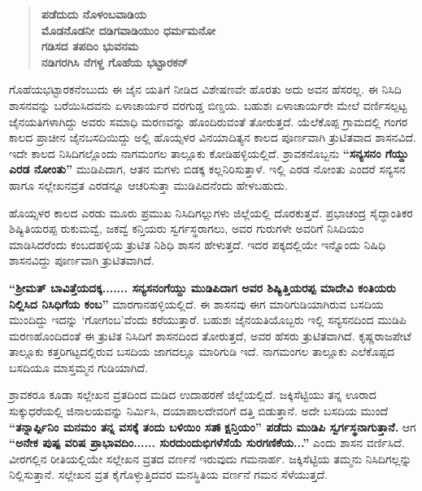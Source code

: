 \begin{verse}
\textbf{ಪಡೆದುದು ನೊಳಂಬವಾಡಿಯ} \\\textbf{ಮೊಡನೊಡನೀ ದಡಿಗವಾಡಿಯುಂ ಧರ್ಮಮನೋ} \\\textbf{ಗಡಿಸದ ತಪದಿಂ ಭುವನಮ} \\\textbf{ನಡಿಗರಗಿಸಿ ನೆಗಳ್ದ ಗೊಹೆಯ ಭಟ್ಟಾರಕನ್​}
\end{verse}

ಗೊಹೆಯಭಟ್ಟಾರಕನೆಂಬುದು ಈ ಜೈನ ಯತಿಗೆ ನೀಡಿದ ವಿಶೇಷಣವೇ ಹೊರತು ಅದು ಅವನ ಹೆಸರಲ್ಲ. ಈ ನಿಸಿದಿ ಶಾಸನವನ್ನು ಬರೆಯಿಸಿದವನು ಏಳಾಚಾರ್ಯರ ವರಗುಡ್ಡ ಬಿಣ್ಡಯ. ಬಹುಶಃ ಏಳಾಚಾರ್ಯರೇ ಮೇಲೆ ವರ್ಣಿಸಲ್ಪಟ್ಟ ಜೈನಯತಿಗಳಾಗಿದ್ದು ಅವರು ಸಮಾಧಿ ಮರಣವನ್ನು ಹೊಂದಿರುವಂತೆ ತೋರುತ್ತದೆ. ಯೆಲೆಕೊಪ್ಪ ಗ್ರಾಮದಲ್ಲಿ ಗಂಗರ ಕಾಲದ ಪ್ರಾಚೀನ ಜೈನಬಸದಿಯಿದ್ದು ಅಲ್ಲಿ ಹೊಯ್ಸಳರ ವಿನಯಾದಿತ್ಯನ ಕಾಲದ ಪೂರ್ಣವಾಗಿ ತ್ರುಟಿತವಾದ ಶಾಸನವಿದೆ. ಇದೇ ಕಾಲದ ನಿಸಿದಿಗಲ್ಲೊಂದು ನಾಗಮಂಗಲ ತಾಲ್ಲೂಕು ಕೋಡಿಹಳ್ಳಿಯಲ್ಲಿದೆ. ಶ್ರಾವಕನೊಬ್ಬನು \textbf{“ಸನ್ಯಸನಂ ಗೆಯ್ದು ಎರಡ ನೋಂತು”} ಮುಡಿಪಿದಾಗ, ಆತನ ಮಗಳು ಬಿಡಕ್ಕ ಕಲ್ಲನಿರಿಸುತ್ತಾಳೆ. ಇಲ್ಲಿ ಎರಡ ನೋಂತು ಎಂದರೆ ಸನ್ಯಸನ ಹಾಗೂ ಸಲ್ಲೇಖನವ್ರತ ಎರಡನ್ನೂ ಆಚರಿಸುತ್ತಾ ಮುಡಿಪಿದನೆಂದು ಹೇಳಬಹುದು.

ಹೊಯ್ಸಳರ ಕಾಲದ ಎರಡು ಮೂರು ಪ್ರಮುಖ ನಿಸಿದಿಗಲ್ಲುಗಳು ಜಿಲ್ಲೆಯಲ್ಲಿ ದೊರಕುತ್ತವೆ. ಪ್ರಭಾಚಂದ್ರ ಸೈದ್ಧಾಂತಿಕರ ಶಿಷ್ಯಿತಿಯರಪ್ಪ ರುಕುಮವ್ವೆ, ಜಕವ್ವೆ ಕನ್ತಿಯರು ಸ್ವರ್ಗಸ್ಥರಾಗಲು, ಅವರ ಗುರುಗಳೇ ಅವರಿಗೆ ನಿಸಿದಿಯಂ ಮಾಡಿಸಿದರೆಂದು ಕಂಬದಹಳ್ಳಿಯ ತ್ರುಟಿತ ನಿಶಿಧಿ ಶಾಸನ ಹೇಳುತ್ತದೆ. ಇದರ ಪಕ್ಕದಲ್ಲಿಯೇ ಇನ್ನೊಂದು ನಿಷಿಧಿ ಶಾಸನವಿದ್ದು ಪೂರ್ಣವಾಗಿ ತ್ರುಟಿತವಾಗಿದೆ.

\textbf{“ಶ‍್ರೀಮತ್​ ಬಾವಿತ್ತೆಯದಕ್ಕ....... ಸನ್ಯಸನಂಗೆಯ್ದು ಮುಡಿಪಿದಾಗ ಅವರ ಶಿಷ್ಯಿತ್ತಿಯರಪ್ಪ ಮಾದೇವಿ ಕಂತಿಯರು ನಿಲ್ಲಿಸಿದ ನಿಸಿಧಿಗೆಯ ಕಂಬ”} ಮಾರಗಾನಹಳ್ಳಿಯಲ್ಲಿದೆ. ಈ ಶಾಸನವು ಈಗ ಮಾರಿಗುಡಿಯಾಗಿರುವ ಬಸದಿಯ ಮುಂದಿದ್ದು ಇದನ್ನು ‘ಗೋಗಂಬ’ವೆಂದು ಕರೆಯುತ್ತಾರೆ. ಬಹುಶಃ ಜೈನಯತಿಯೊಬ್ಬರು ಇಲ್ಲಿ ಸನ್ಯಸನದಿಂದ ಮುಡಿಪಿ ಮರಣಹೊಂದಿದಂತೆ ಈ ತ್ರುಟಿತ ನಿಸಿದಿಗೆ ಶಾಸನದಿಂದ ತೋರುತ್ತದೆ, ಅವರ ಹೆಸರು ತ್ರುಟಿತವಾಗಿದೆ. ಕೃಷ್ಣರಾಜಪೇಟೆ ತಾಲ್ಲೂಕು ಕತ್ತರಿಗಟ್ಟದಲ್ಲಿರುವ ಬಸದಿಯ ಜಾಗದಲ್ಲೂ ಮಾರಿಗುಡಿ ಇದೆ. ನಾಗಮಂಗಲ ತಾಲ್ಲೂಕು ಎಲೆಕೊಪ್ಪದ ಬಸದಿಯೂ ಮಾಸ್ತಮ್ಮನ ಗುಡಿಯಾಗಿದೆ.

ಶ್ರಾವಕರೂ ಕೂಡಾ ಸಲ್ಲೇಖನ ವ್ರತದಿಂದ ಮಡಿದ ಉದಾಹರಣೆ ಜಿಲ್ಲೆಯಲ್ಲಿದೆ. ಜಕ್ಕಿಸೆಟ್ಟಿಯು ತನ್ನ ಊರಾದ ಸುಕ್ಕುಧರೆಯಲ್ಲಿ ಜಿನಾಲಯವನ್ನು ನಿರ್ಮಿಸಿ, ದಯಾಪಾಲದೇವರಿಗೆ ದತ್ತಿ ಬಿಡುತ್ತಾನೆ. ಅದೇ ಬಸದಿಯ ಮುಂದೆ \textbf{“ತನ್ನಾರ್ಪ್ಪಿನಿಂ ಮನಮಂ ತನ್ನ ವಸಕ್ಕೆ ತಂದು ಬಳಿಯಿಂ ಸತ್ಕ್ಷಾನ್ತಿಯಂ” ಪಡೆದು ಮುಡಿಪಿ ಸ್ವರ್ಗಸ್ಥನಾಗುತ್ತಾನೆ.} ಆಗ \textbf{“ಅನೇಕ ಪುಷ್ಪ ವರಿಷ ಪ್ರಾಭಾವದಿಂ...... ಸುರದುಂದುಭಿಗಳೆಸೆಯೆ ಸುರಗಣಿಕೆಯ...”} ಎಂದು ಶಾಸನ ವರ್ಣಿಸಿದೆ. ವೀರಗಲ್ಲಿನ ರೀತಿಯಲ್ಲಿಯೇ ಸಲ್ಲೇಖನ ವ್ರತದ ವರ್ಣನೆ ಇರುವುದು ಗಮನಾರ್ಹ. ಜಕ್ಕಿಸೆಟ್ಟಿಯ ತಮ್ಮನು ನಿಸಿದಿಗಲ್ಲನ್ನು ನಿಲ್ಲಿಸುತ್ತಾನೆ. ಸಲ್ಲೇಖನ ವ್ರತ ಕೈಗೊಳ್ಳುತ್ತಿದವರ ಮನಸ್ಥಿತಿಯ ವರ್ಣನೆ ಗಮನ ಸೆಳೆಯುತ್ತದೆ.


